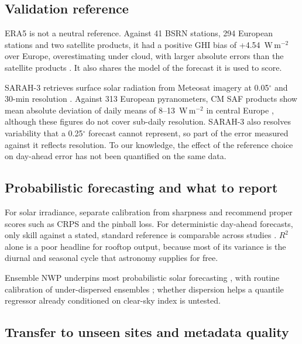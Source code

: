 \subsection{Validation reference}
\label{sec:rw-reference}

ERA5 is not a neutral reference. Against 41 BSRN stations, 294 European stations and two satellite products, it had a positive GHI bias of +4.54~W\,m$^{-2}$ over Europe, overestimating under cloud, with larger absolute errors than the satellite products \citep{Urraca2018}. It also shares the model of the forecast it is used to score.

SARAH-3 retrieves surface solar radiation from Meteosat imagery at 0.05$^\circ$ and 30-min resolution \citep{Pfeifroth2024,Pfeifroth2023}. Against 313 European pyranometers, CM SAF products show mean absolute deviation of daily means of 8--13~W\,m$^{-2}$ in central Europe \citep{Urraca2017}, although these figures do not cover sub-daily resolution. SARAH-3 also resolves variability that a 0.25$^\circ$ forecast cannot represent, so part of the error measured against it reflects resolution. To our knowledge, the effect of the reference choice on day-ahead error has not been quantified on the same data.

\subsection{Probabilistic forecasting and what to report}
\label{sec:rw-prob}

For solar irradiance, \citet{Lauret2019} separate calibration from sharpness and recommend proper scores \citep{Gneiting2007} such as CRPS and the pinball loss. For deterministic day-ahead forecasts, only skill against a stated, standard reference is comparable across studies \citep{Yang2019,Yang2020c}. $R^2$ alone is a poor headline for rooftop output, because most of its variance is the diurnal and seasonal cycle that astronomy supplies for free.

Ensemble NWP underpins most probabilistic solar forecasting \citep{Wang2022}, with routine calibration of under-dispersed ensembles \citep{YangYangLiu2023}; whether dispersion helps a quantile regressor already conditioned on clear-sky index is untested.

\subsection{Transfer to unseen sites and metadata quality}
\label{sec:rw-transfer}


